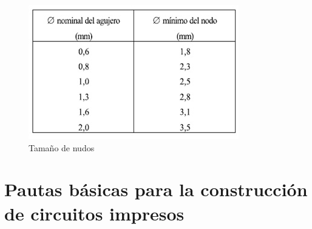 \documentclass[a4paper,12pt,twoside]{proyectotanquesecci}
\begin{document}
\begin{figure}[h]
\centering
\includegraphics[scale=0.8]{Tabla2.jpg}
\renewcommand{\figurename}{Fig.}
\caption{Tamaño de nudos}
\label{Tamaño de nudos}
\end{figure}

\section{Pautas básicas para la construcción de circuitos impresos}
\end{document}
